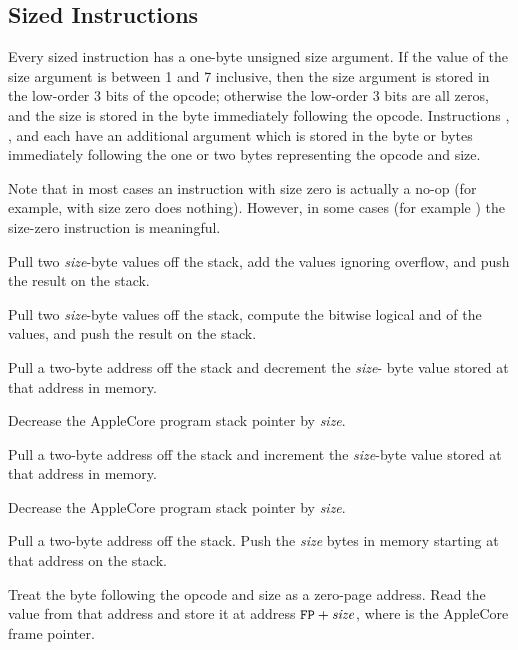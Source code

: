 \documentclass[10pt]{article}
\begin{document}
\subsection{Sized Instructions}

Every sized instruction has a one-byte unsigned size argument.  If the
value of the size argument is between 1 and 7 inclusive, then the size
argument is stored in the low-order 3 bits of the opcode; otherwise
the low-order 3 bits are all zeros, and the size is stored in the byte
immediately following the opcode.  Instructions , ,
and  each have an additional argument which is stored in the
byte or bytes immediately following the one or two bytes representing
the opcode and size.

Note that in most cases an instruction with size zero is actually a
no-op (for example,  with size zero does nothing).  However,
in some cases (for example ) the size-zero instruction is
meaningful.

 Pull two \emph{size}-byte
values off the stack, add the values ignoring overflow, and push the
result on the stack.

 Pull two
\emph{size}-byte values off the stack, compute the bitwise logical and
of the values, and push the result on the stack.

 Pull a two-byte
address off the stack and decrement the \emph{size}- byte value stored
at that address in memory.

Decrease the AppleCore program stack pointer by \emph{size}.

 Pull a two-byte address
off the stack and increment the \emph{size}-byte value stored at that
address in memory.

Decrease the AppleCore program stack pointer by \emph{size}.

Pull a two-byte address off the stack. Push the \emph{size}
bytes in memory starting at that address on the stack.

Treat the byte following the opcode and size as a zero-page
address.  Read the value from that address and store it
at address $\texttt{FP}+\mbox{\textit{size}}$, where  is the
AppleCore frame pointer.
\end{document}
